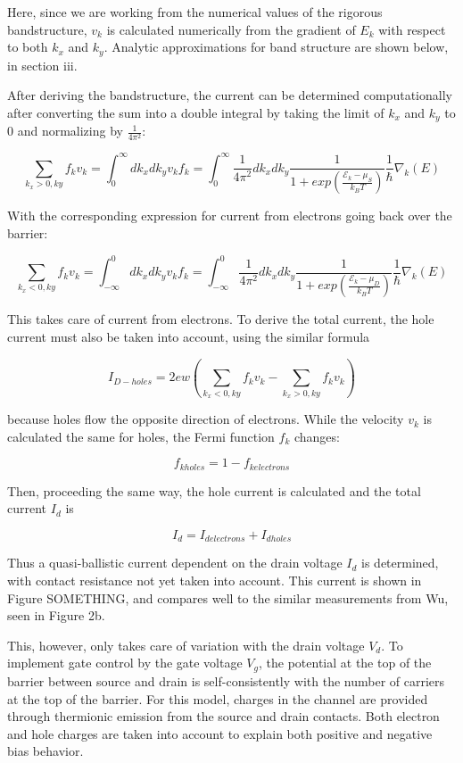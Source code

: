 \documentclass[11pt]{article}
\begin{document}
Here, since we are working from the numerical values of the rigorous bandstructure, $v_k$ is calculated numerically from the gradient of $E_k$ with respect to both $k_x$ and $k_y$. Analytic approximations for band structure are shown below, in section iii.

After deriving the bandstructure, the current can be determined computationally after converting the sum into a double integral by taking the limit of $k_x$ and $k_y$ to 0 and normalizing by $\frac{1}{4\pi^2}$:

$$\sum_{k_x>0, ky}f_{k}v_{k} =\int_{0}^{\infty}dk_xdk_yv_{k}f_{k} = \int_{0}^{\infty}\frac{1}{4\pi^2}dk_xdk_y\frac{1}{1+exp(\frac{\mathcal{E}_{k} - \mu_S}{k_BT})}\frac{1}{\hbar}\nabla_k(E)$$

With the corresponding expression for current from electrons going back over the barrier:

$$\sum_{k_x<0, ky}f_{k}v_{k} =\int_{-\infty}^{0}dk_xdk_yv_{k}f_{k} = \int_{-\infty}^{0}\frac{1}{4\pi^2}dk_xdk_y\frac{1}{1+exp(\frac{\mathcal{E}_{k} - \mu_D}{k_BT})}\frac{1}{\hbar}\nabla_k(E)$$

This takes care of current from electrons. To derive the total current, the hole current must also be taken into account, using the similar formula

$$I_{D-holes} = 2ew(\sum_{k_x<0, ky}f_{k}v_{k} - \sum_{k_x>0, ky}f_{k}v_{k})$$

because holes flow the opposite direction of electrons. While the velocity $v_k$ is calculated the same for holes, the Fermi function $f_k$ changes:

$$f_{kholes}=1-f_{kelectrons}$$

Then, proceeding the same way, the hole current is calculated and the total current $I_d$ is

$$I_d = I_{delectrons}+I_{dholes}$$

Thus a quasi-ballistic current dependent on the drain voltage $I_d$ is determined, with contact resistance not yet taken into account. This current is shown in Figure SOMETHING, and compares well to the similar measurements from Wu, seen in Figure 2b.


This, however, only takes care of variation with the drain voltage $V_d$. To implement gate control by the gate voltage $V_g$, the potential at the top of the barrier between source and drain is self-consistently with the number of carriers at the top of the barrier. For this model, charges in the channel are provided through thermionic emission from the source and drain contacts. Both electron and hole charges are taken into account to explain both positive and negative bias behavior. 
\end{document}
